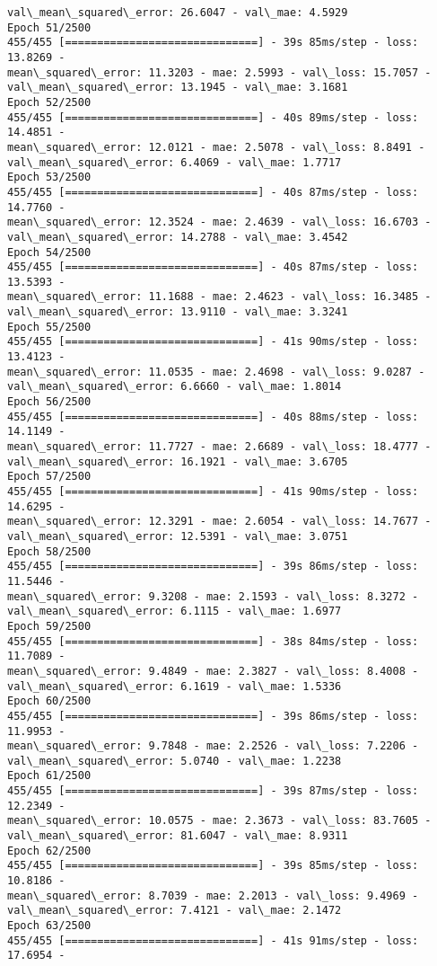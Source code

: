 \documentclass[11pt]{article}
\begin{document}
\begin{Verbatim}[commandchars=\\\{\}]
val\_mean\_squared\_error: 26.6047 - val\_mae: 4.5929
Epoch 51/2500
455/455 [==============================] - 39s 85ms/step - loss: 13.8269 -
mean\_squared\_error: 11.3203 - mae: 2.5993 - val\_loss: 15.7057 -
val\_mean\_squared\_error: 13.1945 - val\_mae: 3.1681
Epoch 52/2500
455/455 [==============================] - 40s 89ms/step - loss: 14.4851 -
mean\_squared\_error: 12.0121 - mae: 2.5078 - val\_loss: 8.8491 -
val\_mean\_squared\_error: 6.4069 - val\_mae: 1.7717
Epoch 53/2500
455/455 [==============================] - 40s 87ms/step - loss: 14.7760 -
mean\_squared\_error: 12.3524 - mae: 2.4639 - val\_loss: 16.6703 -
val\_mean\_squared\_error: 14.2788 - val\_mae: 3.4542
Epoch 54/2500
455/455 [==============================] - 40s 87ms/step - loss: 13.5393 -
mean\_squared\_error: 11.1688 - mae: 2.4623 - val\_loss: 16.3485 -
val\_mean\_squared\_error: 13.9110 - val\_mae: 3.3241
Epoch 55/2500
455/455 [==============================] - 41s 90ms/step - loss: 13.4123 -
mean\_squared\_error: 11.0535 - mae: 2.4698 - val\_loss: 9.0287 -
val\_mean\_squared\_error: 6.6660 - val\_mae: 1.8014
Epoch 56/2500
455/455 [==============================] - 40s 88ms/step - loss: 14.1149 -
mean\_squared\_error: 11.7727 - mae: 2.6689 - val\_loss: 18.4777 -
val\_mean\_squared\_error: 16.1921 - val\_mae: 3.6705
Epoch 57/2500
455/455 [==============================] - 41s 90ms/step - loss: 14.6295 -
mean\_squared\_error: 12.3291 - mae: 2.6054 - val\_loss: 14.7677 -
val\_mean\_squared\_error: 12.5391 - val\_mae: 3.0751
Epoch 58/2500
455/455 [==============================] - 39s 86ms/step - loss: 11.5446 -
mean\_squared\_error: 9.3208 - mae: 2.1593 - val\_loss: 8.3272 -
val\_mean\_squared\_error: 6.1115 - val\_mae: 1.6977
Epoch 59/2500
455/455 [==============================] - 38s 84ms/step - loss: 11.7089 -
mean\_squared\_error: 9.4849 - mae: 2.3827 - val\_loss: 8.4008 -
val\_mean\_squared\_error: 6.1619 - val\_mae: 1.5336
Epoch 60/2500
455/455 [==============================] - 39s 86ms/step - loss: 11.9953 -
mean\_squared\_error: 9.7848 - mae: 2.2526 - val\_loss: 7.2206 -
val\_mean\_squared\_error: 5.0740 - val\_mae: 1.2238
Epoch 61/2500
455/455 [==============================] - 39s 87ms/step - loss: 12.2349 -
mean\_squared\_error: 10.0575 - mae: 2.3673 - val\_loss: 83.7605 -
val\_mean\_squared\_error: 81.6047 - val\_mae: 8.9311
Epoch 62/2500
455/455 [==============================] - 39s 85ms/step - loss: 10.8186 -
mean\_squared\_error: 8.7039 - mae: 2.2013 - val\_loss: 9.4969 -
val\_mean\_squared\_error: 7.4121 - val\_mae: 2.1472
Epoch 63/2500
455/455 [==============================] - 41s 91ms/step - loss: 17.6954 -

\end{Verbatim}
\end{document}
